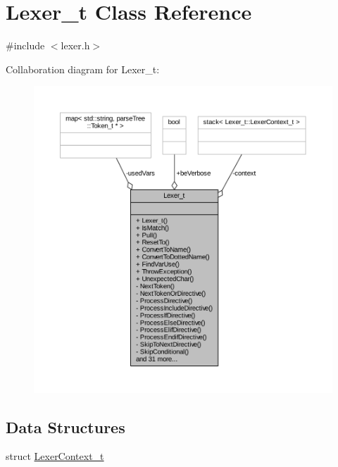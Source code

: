 \hypertarget{class_lexer__t}{}\section{Lexer\+\_\+t Class Reference}
\label{class_lexer__t}


{\ttfamily \#include $<$lexer.\+h$>$}



Collaboration diagram for Lexer\+\_\+t\+:
\nopagebreak
\begin{figure}[H]
\begin{center}
\leavevmode
\includegraphics[width=350pt]{class_lexer__t__coll__graph}
\end{center}
\end{figure}
\subsection*{Data Structures}
\begin{DoxyCompactItemize}
\item 
struct \hyperlink{struct_lexer__t_1_1_lexer_context__t}{Lexer\+Context\+\_\+t}
\end{DoxyCompactItemize}
